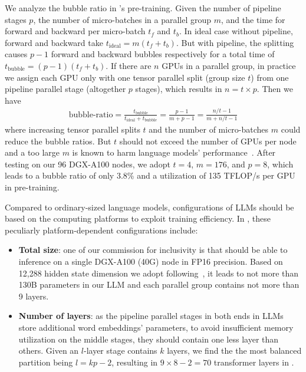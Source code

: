 {We analyze the bubble ratio in \glm's pre-training. Given the number of pipeline stages $p$, the number of micro-batches in a parallel group $m$, and the time for forward and backward per micro-batch $t_f$ and $t_b$. 
In ideal case without pipeline, forward and backward take $t_{\mathrm{ideal}} = m(t_f + t_b)$. 
But with pipeline, the splitting causes $p - 1$ forward and backward bubbles respectively for a total time of $t_{\mathrm{bubble}} = (p - 1)( t_f + t_b)$.
If there are $n$ GPUs in a parallel group, in practice we assign each GPU only with one tensor parallel split (group size $t$) from one pipeline parallel stage (altogether $p$ stages), which results in $n=t\times p$.
Then we have
\begin{equation}
    \begin{split}
        \text{bubble-ratio} = \frac {t_{\mathrm{bubble}}} {t_{\mathrm{ideal}} + t_{\mathrm{bubble}}} = \frac {p - 1} {m + p - 1} = \frac {n/t - 1} {m + n/t - 1} 
    \end{split}
\end{equation}
\noindent where increasing tensor parallel splits $t$ and the number of micro-batches $m$ could reduce the bubble ratios.
But $t$ should not exceed the number of GPUs per node and a too large $m$ is known to harm language models' performance~\citep{you2020large}.
After testing on our 96 DGX-A100 nodes, we adopt $t=4$, $m=176$, and $p=8$, which leads to a bubble ratio of only 3.8\% and a utilization of 135 TFLOP/s per GPU in pre-training.

Compared to ordinary-sized language models, configurations of LLMs should be based on the computing platforms to exploit training efficiency.
In \glm, these peculiarly platform-dependent configurations include:
\begin{itemize}[leftmargin=*,itemsep=0pt,parsep=0.2em,topsep=0.0em,partopsep=0.0em]
    \item \textbf{Total size}: one of our commission for inclusivity is that \glm should be able to inference on a single DGX-A100 (40G) node in FP16 precision. Based on 12,288 hidden state dimension we adopt following~\citep{brown2020language}, it leads to not more than 130B parameters in our LLM and each parallel group contains not more than 9 layers. 
    \item \textbf{Number of layers}: as the pipeline parallel stages in both ends in LLMs store additional word embeddings' parameters, to avoid insufficient memory utilization on the middle stages, they should contain one less layer than others. Given an $l$-layer \glm stage contains $k$ layers, we find the the most balanced partition being $l=kp - 2$, resulting in $9\times8 - 2=70$ transformer layers in \glm.
\end{itemize}

}
